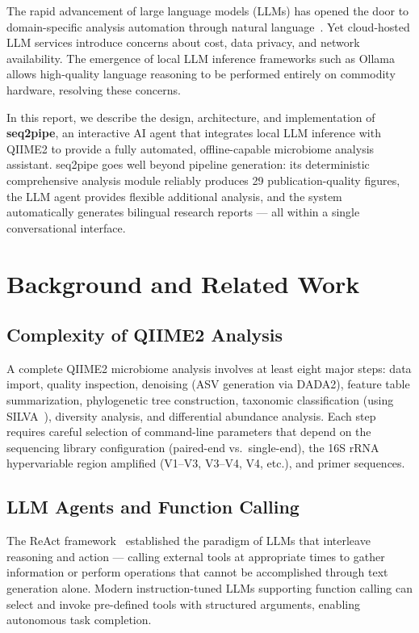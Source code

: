 \documentclass[12pt, a4paper]{article}
\begin{document}
The rapid advancement of large language models (LLMs) has opened the door to
domain-specific analysis automation through natural language~\cite{brown2020gpt3}.
Yet cloud-hosted LLM services introduce concerns about cost, data privacy,
and network availability. The emergence of local LLM inference frameworks
such as Ollama~\cite{ollama} allows high-quality language reasoning to be
performed entirely on commodity hardware, resolving these concerns.

In this report, we describe the design, architecture, and implementation of
\textbf{seq2pipe}, an interactive AI agent that integrates local LLM inference
with QIIME2 to provide a fully automated, offline-capable microbiome analysis
assistant. seq2pipe goes well beyond pipeline generation: its deterministic
comprehensive analysis module reliably produces 29 publication-quality figures,
the LLM agent provides flexible additional analysis,
and the system automatically generates bilingual research reports --- all within
a single conversational interface.

\section{Background and Related Work}

\subsection{Complexity of QIIME2 Analysis}

A complete QIIME2 microbiome analysis involves at least eight major steps:
data import, quality inspection, denoising (ASV generation via DADA2),
feature table summarization, phylogenetic tree construction,
taxonomic classification (using SILVA~\cite{silva}),
diversity analysis, and differential abundance analysis.
Each step requires careful selection of command-line parameters that depend on
the sequencing library configuration (paired-end vs.\ single-end),
the 16S rRNA hypervariable region amplified (V1--V3, V3--V4, V4, etc.),
and primer sequences.

\subsection{LLM Agents and Function Calling}

The ReAct framework~\cite{yao2023react} established the paradigm of
LLMs that interleave reasoning and action --- calling external tools
at appropriate times to gather information or perform operations
that cannot be accomplished through text generation alone.
Modern instruction-tuned LLMs supporting function calling
can select and invoke pre-defined tools with structured arguments,
enabling autonomous task completion.
\end{document}
